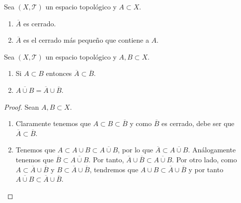 \begin{colorary}
	Sea $\displaystyle \left(X, \mathcal{T}\right) $ un espacio topológico y $\displaystyle A \subset X $. 
\begin{enumerate}
\item $\displaystyle \overline{A} $ es cerrado.
\item $\displaystyle \overline{A} $ es el cerrado más pequeño que contiene a $\displaystyle A $. 
\end{enumerate}
\end{colorary}
\begin{prop}
Sea $\displaystyle \left(X, \mathcal{T}\right) $ un espacio topológico y $\displaystyle A,B \subset X $.  
\begin{enumerate}
\item Si $\displaystyle A \subset B $ entonces $\displaystyle \overline{A}\subset \overline{B} $.
\item $\displaystyle \overline{A\cup B} = \overline{A} \cup \overline{B}$.
\end{enumerate}
\end{prop}
\begin{proof} Sean $\displaystyle A, B \subset X $.
\begin{enumerate}
\item Claramente tenemos que $\displaystyle A \subset B \subset \overline{B} $ y como $\displaystyle \overline{B} $ es cerrado, debe ser que $\displaystyle \overline{A}\subset \overline{B} $.
\item Tenemos que $\displaystyle A \subset A \cup B \subset \overline{A \cup B}$, por lo que $\displaystyle \overline{A}\subset \overline{A \cup B} $. Análogamente tenemos que $\displaystyle \overline{B}\subset \overline{A\cup B} $. Por tanto, $\displaystyle \overline{A} \cup \overline{B} \subset \overline{A \cup B} $. Por otro lado, como $\displaystyle A \subset \overline{A} \cup \overline{B} $ y $\displaystyle B \subset \overline{A} \cup \overline{B} $, tendremos que $\displaystyle A \cup B \subset \overline{A} \cup \overline{B} $ y por tanto $\displaystyle \overline{A \cup B}\subset \overline{A} \cup \overline{B} $.
\end{enumerate}
\end{proof}

